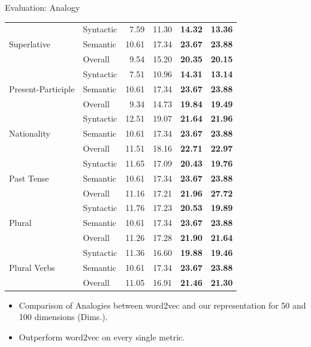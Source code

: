 \documentclass[8pt]{beamer}
\begin{document}
\begin{frame}{Evaluation: Analogy}
{\begin{tabular}{ll|rr|rr}
        \multirow{3}{*}{Superlative}        & Syntactic & 7.59      & 11.30     & \bf 14.32 & \bf 13.36         \\
                                            & Semantic  & 10.61     & 17.34     & \bf 23.67 & \bf 23.88         \\
                                            & Overall   & 9.54      & 15.20     & \bf 20.35 & \bf 20.15         \\ \hline
        \multirow{3}{*}{Present-Participle} & Syntactic & 7.51      & 10.96     & \bf 14.31 & \bf 13.14         \\
                                            & Semantic  & 10.61     & 17.34     & \bf 23.67 & \bf 23.88         \\
                                            & Overall   & 9.34      & 14.73     & \bf 19.84 & \bf 19.49         \\ \hline
        \multirow{3}{*}{Nationality}        & Syntactic & 12.51     & 19.07     & \bf 21.64 & \bf 21.96          \\
                                            & Semantic  & 10.61     & 17.34     & \bf 23.67 & \bf 23.88         \\
                                            & Overall   & 11.51     & 18.16     & \bf 22.71 & \bf 22.97         \\ \hline
        \multirow{3}{*}{Past Tense}         & Syntactic & 11.65     & 17.09     & \bf 20.43 & \bf 19.76         \\
                                            & Semantic  & 10.61     & 17.34     & \bf 23.67 & \bf 23.88         \\
                                            & Overall   & 11.16     & 17.21     & \bf 21.96 & \bf 27.72         \\ \hline
        \multirow{3}{*}{Plural}             & Syntactic & 11.76     & 17.23     & \bf 20.53 & \bf 19.89         \\
                                            & Semantic  & 10.61     & 17.34     & \bf 23.67 & \bf 23.88         \\
                                            & Overall   & 11.26     & 17.28     & \bf 21.90 & \bf 21.64         \\ \hline
        \multirow{3}{*}{Plural Verbs}       & Syntactic & 11.36     & 16.60     & \bf 19.88 & \bf 19.46         \\
                                            & Semantic  & 10.61     & 17.34     & \bf 23.67 & \bf 23.88         \\
                                            & Overall   & 11.05     & 16.91     & \bf 21.46 & \bf 21.30         \\ \hline
    \end{tabular}
}
\begin{itemize}
\item Comparison of Analogies between word2vec and our representation for 50 and 100 dimensions (Dims.).
\item Outperform word2vec on every single metric.
\end{itemize}
\end{frame}
\end{document}
